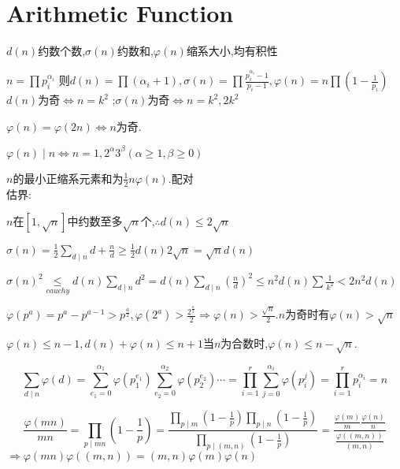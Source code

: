 
\section{Arithmetic Function}
$ d(n)$约数个数,$ \sigma (n)$约数和,$ \varphi(n)$缩系大小,均有积性

$ n=\prod{p_i^{\alpha_i}}$ 则$d(n)=\prod{(\alpha_i+1)},\sigma(n)=\prod{\frac{p_i^{\alpha_i}-1}{p_i-1}},\varphi(n)=n\prod({1-\frac{1}{p_i}})$
\\

$ d(n)$为奇$ \Leftrightarrow n=k^2$ ;$ \sigma(n)$为奇$ \Leftrightarrow n=k^2,2k^2$

$ \varphi(n)=\varphi(2n)\Leftrightarrow n$为奇.

$ \varphi(n) \mid n\Leftrightarrow n=1,2^{\alpha}3^{\beta}(\alpha \ge 1,\beta \ge 0)$

$ n$的最小正缩系元素和为$ \frac{1}{2}n\varphi(n)$.配对
\\

估界:

$ n$在$ [1,\sqrt{n}]$中约数至多$ \sqrt{n}$个,$ \therefore d(n)\le 2\sqrt{n}$

$ \sigma(n)=\frac{1}{2}\sum_{d \mid n}{d+\frac{n}{d}}\ge \frac{1}{2}d(n)2\sqrt{n}=\sqrt{n}d(n)$

$ \sigma(n)^2 \mathop \le \limits_{cauchy} d(n)\sum_{d\mid n}{d^2}=d(n)\sum_{d\mid n}{(\frac{n}{d})^2}\le n^2d(n)\sum{\frac{1}{k^2}}<2n^2d(n)$

$ \varphi(p^a)=p^a-p^{a-1}>p^{\frac{a}{2}},\varphi(2^a)>\frac{2^{\frac{a}{2}}}{2}\Rightarrow \varphi(n)>\frac{\sqrt{n}}{2}.n$为奇时有$ \varphi(n)>\sqrt{n}$

$ \varphi(n)\le n-1,d(n)+\varphi(n)\le n+1$当$ n$为合数时,$ \varphi(n)\le n-\sqrt{n}.$

\[  \sum_{d \mid n}{\varphi(d)}=\sum_{e_1=0}^{\alpha_1}{\varphi(p_1^{e_1})}\sum_{e_2=0}^{\alpha_2}{\varphi(p_2^{e_2})}\cdots =\prod_{i=1}^{r}{\sum_{j=0}^{\alpha_i}{\varphi(p_i^j)}}=\prod_{i=1}^{r}{p_i^{\alpha_i}}=n\]

\[ \frac{\varphi(mn)}{mn}=\prod_{p \mid mn}{(1-\frac{1}{p})}=\frac{\prod_{p \mid m}{(1-\frac{1}{p})}\prod_{p \mid n}{(1-\frac{1}{p})}}{\prod_{p \mid (m,n)}{(1-\frac{1}{p})}}=\frac{\frac{\varphi(m)}{m}\frac{\varphi(n)}{n}}{\frac{\varphi((m,n))}{(m,n)}} \]
$ \Rightarrow \varphi(mn)\varphi((m,n))=(m,n)\varphi(m)\varphi(n) $ 
\\

